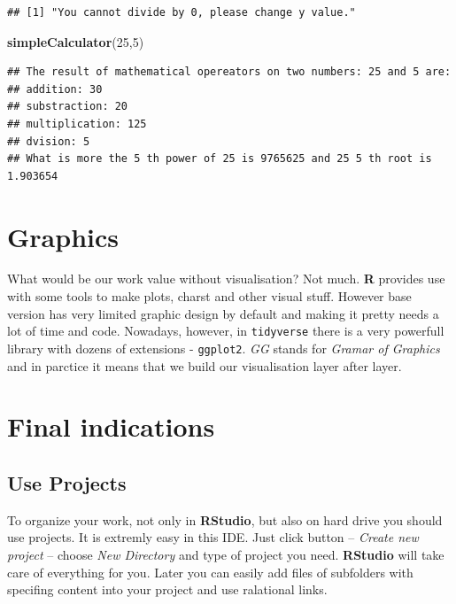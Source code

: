 \documentclass[]{book}
\newenvironment{Shaded}{\begin{snugshade}}{\end{snugshade}}
\newcommand{\KeywordTok}[1]{\textcolor[rgb]{0.12,0.11,0.11}{\textbf{#1}}}
\newcommand{\DecValTok}[1]{\textcolor[rgb]{0.69,0.50,0.00}{#1}}
\newcommand{\NormalTok}[1]{\textcolor[rgb]{0.12,0.11,0.11}{#1}}
\theoremstyle{definition}
\theoremstyle{definition}
\theoremstyle{definition}
\theoremstyle{remark}
\begin{document}
\begin{verbatim}
## [1] "You cannot divide by 0, please change y value."
\end{verbatim}

\begin{Shaded}
\begin{Highlighting}[]
\KeywordTok{simpleCalculator}\NormalTok{(}\DecValTok{25}\NormalTok{,}\DecValTok{5}\NormalTok{)}
\end{Highlighting}
\end{Shaded}

\begin{verbatim}
## The result of mathematical opereators on two numbers: 25 and 5 are: 
## addition: 30 
## substraction: 20 
## multiplication: 125 
## dvision: 5 
## What is more the 5 th power of 25 is 9765625 and 25 5 th root is 1.903654
\end{verbatim}

\chapter{Graphics}\label{graphics}

What would be our work value without visualisation? Not much. \textbf{R}
provides use with some tools to make plots, charst and other visual
stuff. However base version has very limited graphic design by default
and making it pretty needs a lot of time and code. Nowadays, however, in
\texttt{tidyverse} there is a very powerfull library with dozens of
extensions - \texttt{ggplot2}. \emph{GG} stands for \emph{Gramar of
Graphics} and in parctice it means that we build our visualisation layer
after layer.

\chapter{Final indications}\label{final-indications}

\section{Use Projects}\label{use-projects}

To organize your work, not only in \textbf{RStudio}, but also on hard
drive you should use projects. It is extremly easy in this IDE. Just
click button -- \emph{Create new project} -- choose \emph{New Directory}
and type of project you need. \textbf{RStudio} will take care of
everything for you. Later you can easily add files of subfolders with
specifing content into your project and use ralational links.
\end{document}
